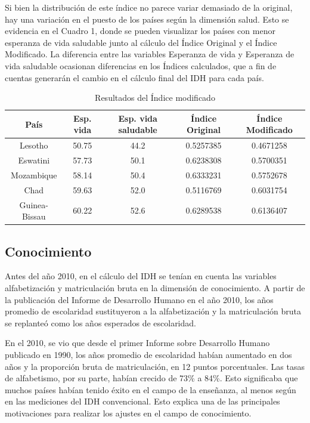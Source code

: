 \documentclass[
  10pt,
]{article}
\begin{document}
Si bien la distribución de este índice no parece variar demasiado de la
original, hay una variación en el puesto de los países según la
dimensión salud. Esto se evidencia en el Cuadro 1, donde se pueden
visualizar los países con menor esperanza de vida saludable junto al
cálculo del Índice Original y el Índice Modificado. La diferencia entre
las variables Esperanza de vida y Esperanza de vida saludable ocasionan
diferencias en los Índices calculados, que a fin de cuentas generarán el
cambio en el cálculo final del IDH para cada país.

\begin{table}[H]

\caption{\label{tab:unnamed-chunk-1}Resultados del Índice modificado}
\centering
\begin{tabular}[t]{c|c|c|c|c}
\hline
País & Esp. vida & Esp. vida saludable & Índice Original & Índice Modificado\\
\hline
Lesotho & 50.75 & 44.2 & 0.5257385 & 0.4671258\\
\hline
Eswatini & 57.73 & 50.1 & 0.6238308 & 0.5700351\\
\hline
Mozambique & 58.14 & 50.4 & 0.6333231 & 0.5752678\\
\hline
Chad & 59.63 & 52.0 & 0.5116769 & 0.6031754\\
\hline
Guinea-Bissau & 60.22 & 52.6 & 0.6289538 & 0.6136407\\
\hline
\end{tabular}
\end{table}

\subsection{Conocimiento}\label{conocimiento-1}

Antes del año 2010, en el cálculo del IDH se tenían en cuenta las
variables alfabetización y matriculación bruta en la dimensión de
conocimiento. A partir de la publicación del Informe de Desarrollo
Humano en el año 2010, los años promedio de escolaridad sustituyeron a
la alfabetización y la matriculación bruta se replanteó como los años
esperados de escolaridad.

En el 2010, se vio que desde el primer Informe sobre Desarrollo Humano
publicado en 1990, los años promedio de escolaridad habían aumentado en
dos años y la proporción bruta de matriculación, en 12 puntos
porcentuales. Las tasas de alfabetismo, por su parte, habían crecido de
73\% a 84\%. Esto significaba que muchos países habían tenido éxito en
el campo de la enseñanza, al menos según en las mediciones del IDH
convencional. Esto explica una de las principales motivaciones para
realizar los ajustes en el campo de conocimiento.
\end{document}
